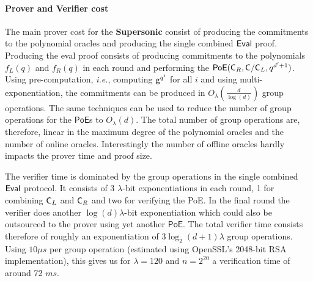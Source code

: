\paragraph{Prover and Verifier cost}
The main prover cost for the \textsf{\textbf{Supersonic}} consist of producing the commitments to the polynomial oracles and producing the single combined $\textsf{{Eval}}$ proof.
Producing the eval proof consists of producing commitments to the polynomials $f_L(q)$ and $f_R(q)$ in each round and performing the $\textsf{PoE}(\mathsf{C}_R,\mathsf{C}/\mathsf{C}_L,q^{d'+1})$. Using pre-computation, \emph{i.e.}, computing $\mathsf{g}^{q^i}$ for all $i$ and using multi-exponentiation, the commitments can be produced in $O_\lambda(\frac{d}{\log(d)})$ group operations. The same techniques can be used to reduce the number of group operations for the $\textsf{PoE}$s to $O_\lambda(d)$. The total number of group operations are, therefore, linear in the maximum degree of the polynomial oracles and the number of online oracles. Interestingly the number of offline oracles hardly impacts the prover time and proof size.
 
 The verifier time is dominated by the group operations in the single combined $\textsf{{Eval}}$ protocol.
It consists of 3 $\lambda$-bit exponentiations in each round, 1 for combining $\mathsf{C}_L$ and $\mathsf{C}_R$ and two for verifying the \textsf{PoE}. In the final round the verifier does another $\log(d)\lambda$-bit exponentiation which could also be outsourced to the prover using yet another $\textsf{PoE}$. The total verifier time consists therefore of roughly an exponentiation of $3 \log_2(d+1) \lambda$ group operations. 
Using $10\mu s$ per group operation (estimated using OpenSSL's 2048-bit RSA implementation), this gives us for $\lambda=120$ and $n=2^{20}$ a verification time of around 72 $ms$. 

\vspace{-1em}
